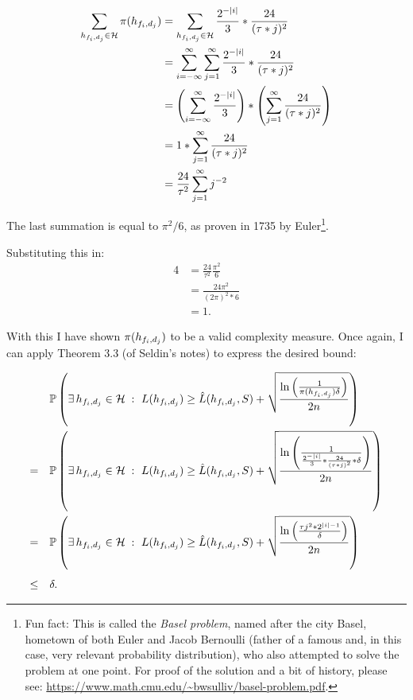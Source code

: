 \begin{alignat*}{4}
  \sum_{h_{f_{i}, d_{j}} \in \mathcal H}\pi(h_{f_{i}, d_{j}}) &= \sum_{h_{f_{i}, d_{j}} \in \mathcal H} \frac{2^{-|i|}}{3} * \frac{24}{(\tau * j)^2}\\
  &= \sum_{i = -\infty}^\infty \sum_{j = 1}^\infty \frac{2^{-|i|}}{3} * \frac{24}{(\tau * j)^2}\\
  &= \left(\sum_{i = -\infty}^\infty \frac{2^{-|i|}}{3}\right) * \left(\sum_{j = 1}^\infty \frac{24}{(\tau * j)^2}\right)\\
  &= 1 * \sum_{j = 1}^\infty \frac{24}{(\tau * j)^2}\\
  &= \frac{24}{\tau^2}\sum_{j = 1}^\infty j^{-2}
\end{alignat*}

The last summation is equal to $\pi^2 / 6$, as proven in 1735 by
Euler\footnote{Fun fact: This is called the \textit{Basel problem}, named after
the city Basel, hometown of both Euler and Jacob Bernoulli (father of a famous
and, in this case, very relevant probability distribution), who also attempted
to solve the problem at one point. For proof of the solution and a bit of history, please see:
\url{https://www.math.cmu.edu/~bwsulliv/basel-problem.pdf}.}.

Substituting this in:
\begin{alignat*}{4}
  &= \frac{24}{\tau^2}\frac{\pi^2}{6}\\
  &= \frac{24\pi^2}{(2 \pi)^2 * 6}\\
  &= 1.
\end{alignat*}

With this I have shown $\pi(h_{f_{i}, d_{j}})$ to be a valid complexity measure. Once again,
I can apply Theorem 3.3 (of Seldin's notes) to express the desired bound:

\begin{alignat*}{3}
  &\mathbb P \left(\exists\, h_{f_{i}, d_{j}} \in \mathcal H\; :\ L(h_{f_{i}, d_{j}}) \geq \hat{L}(h_{f_{i}, d_{j}}, S) + \sqrt{\frac{\ln \left(\frac{1}{\pi(h_{f_{i}, d_{j}})\delta}\right)}{2n}}\right)\\
  =\quad &\mathbb P \left(\exists\, h_{f_{i}, d_{j}} \in \mathcal H\; :\ L(h_{f_{i}, d_{j}}) \geq \hat{L}(h_{f_{i}, d_{j}}, S) + \sqrt{\frac{
    \ln
  \left(
\frac{1}{\frac{2^{-|i|}}{3} * \frac{24}{(\tau * j)^2} * \delta}
  \right)}{2n}}\right)\\
  =\quad &\mathbb P \left(\exists\, h_{f_{i}, d_{j}} \in \mathcal H\; :\ L(h_{f_{i}, d_{j}}) \geq \hat{L}(h_{f_{i}, d_{j}}, S) + \sqrt{\frac{
    \ln
  \left(
\frac{\tau j^2 * 2^{|i| - 1}}{\delta}
  \right)}{2n}}\right)\\[4pt]
\leq\quad &\delta.
\end{alignat*}

\sectend

